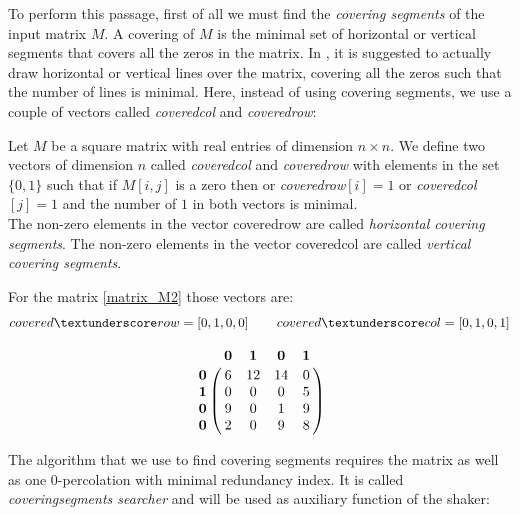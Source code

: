 \documentclass[12pt]{ClasseMatematicamente}
\begin{document}
To perform this passage, first of all we must find the \emph{covering segments} of the input matrix $M$. A covering of $M$ is the minimal set of horizontal or vertical segments that covers all the zeros in the matrix. In \cite{sito_1}, it is suggested to actually draw horizontal or vertical lines over the matrix, covering all the zeros such that the number of lines is minimal.
Here, instead of using covering segments, we use a couple of vectors called \emph{covered\textunderscore col} and \emph{covered\textunderscore row}:
\begin{definition}
 Let $M$ be a square matrix with real entries of dimension $n\times n$. We define two vectors of dimension $n$ called \emph{covered\textunderscore col} and \emph{covered\textunderscore row} with elements in the set $\lbrace 0,1 \rbrace$ 
 such that if $M[i,j]$ is a zero then or \emph{covered\textunderscore row}$[i] = 1$ or \emph{covered\textunderscore col}$[j] = 1$ and the number of $1$ in both vectors is minimal. \\
 The non-zero elements in the vector covered\textunderscore row  are called \emph{horizontal covering segments}. The non-zero elements in the vector covered\textunderscore col are called \emph{vertical covering segments}.
\end{definition}
For the matrix \ref{matrix_M2} those vectors are:
$$
covered\textunderscore row = \left[0, 1, 0, 0\right]\qquad covered\textunderscore col = \left[0, 1, 0, 1\right]
$$

$$
\bordermatrix{\text{} & \mathbf{0} & \mathbf{1} & \mathbf{0} & \mathbf{1} \cr
                \mathbf{0} &    6 & 12 & 14 & 0  \cr
                \mathbf{1} &    0 & 0 & 0 & 5  \cr
                \mathbf{0} &    9 & 0 & 1 & 9  \cr
                \mathbf{0} &    2 & 0 & 9 & 8   }
$$

\noindent
The algorithm that we use to find covering segments requires the matrix as well as one $0$-percolation with minimal redundancy index. It is called \emph{covering\textunderscore segments \textunderscore searcher} and will be used as auxiliary function of the shaker:
\end{document}
